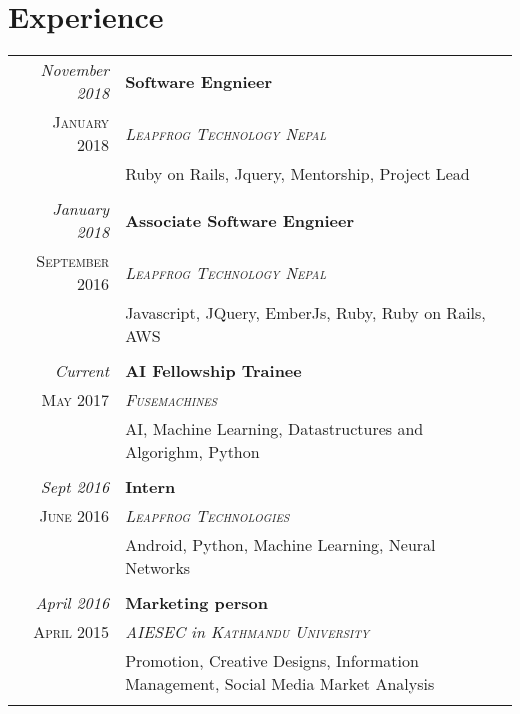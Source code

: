 \documentclass[a4paper,10pt]{article}
\begin{document}
\section{Experience}
\begin{tabular}{r|p{11cm}}
\emph{November 2018	} & \textbf{Software Engnieer}\\ \textsc{January 2018} & \emph{\textsc{Leapfrog Technology Nepal}} \\&\footnotesize{Ruby on Rails, Jquery, Mentorship, Project Lead}\\\multicolumn{2}{c}{} \\
\emph{January 2018} & \textbf{Associate Software Engnieer}\\ \textsc{September 2016} & \emph{\textsc{Leapfrog Technology Nepal}} \\&\footnotesize{Javascript, JQuery, EmberJs, Ruby, Ruby on Rails, AWS}\\\multicolumn{2}{c}{} \\
 \emph{Current} & \textbf{AI Fellowship Trainee}\\ \textsc{May 2017} & \emph{\textsc{Fusemachines}} \\&\footnotesize{AI, Machine Learning, Datastructures and Algorighm, Python}\\\multicolumn{2}{c}{} \\
 \emph{Sept 2016} & \textbf{Intern}\\ \textsc{June 2016} & \emph{\textsc{Leapfrog Technologies}} \\&\footnotesize{Android, Python, Machine Learning, Neural Networks}\\\multicolumn{2}{c}{} \\
 \emph{April 2016} & \textbf{Marketing person}\\ \textsc{April 2015} & \emph{\textsc{AIESEC} in \textsc{Kathmandu University}} \\&\footnotesize{Promotion, Creative Designs, Information Management, Social Media Market Analysis}\\\multicolumn{2}{c}{} \\
\end{tabular}
\end{document}
